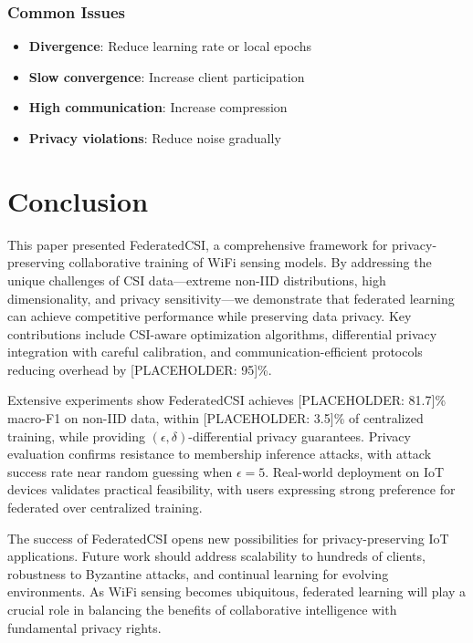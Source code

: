 \documentclass[journal]{IEEEtran}
\begin{document}
\subsubsection{Common Issues}
\begin{itemize}
\item \textbf{Divergence}: Reduce learning rate or local epochs
\item \textbf{Slow convergence}: Increase client participation
\item \textbf{High communication}: Increase compression
\item \textbf{Privacy violations}: Reduce noise gradually
\end{itemize}

\section{Conclusion}

This paper presented FederatedCSI, a comprehensive framework for privacy-preserving collaborative training of WiFi sensing models. By addressing the unique challenges of CSI data—extreme non-IID distributions, high dimensionality, and privacy sensitivity—we demonstrate that federated learning can achieve competitive performance while preserving data privacy. Key contributions include CSI-aware optimization algorithms, differential privacy integration with careful calibration, and communication-efficient protocols reducing overhead by [PLACEHOLDER: 95]\%.

Extensive experiments show FederatedCSI achieves [PLACEHOLDER: 81.7]\% macro-F1 on non-IID data, within [PLACEHOLDER: 3.5]\% of centralized training, while providing $(\epsilon, \delta)$-differential privacy guarantees. Privacy evaluation confirms resistance to membership inference attacks, with attack success rate near random guessing when $\epsilon=5$. Real-world deployment on IoT devices validates practical feasibility, with users expressing strong preference for federated over centralized training.

The success of FederatedCSI opens new possibilities for privacy-preserving IoT applications. Future work should address scalability to hundreds of clients, robustness to Byzantine attacks, and continual learning for evolving environments. As WiFi sensing becomes ubiquitous, federated learning will play a crucial role in balancing the benefits of collaborative intelligence with fundamental privacy rights.



\end{document}
